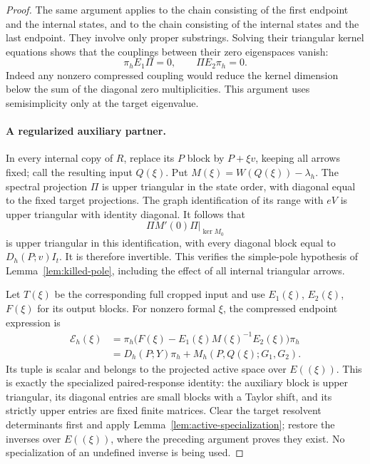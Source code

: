 \documentclass[11pt]{article}
\theoremstyle{definition}
\theoremstyle{remark}
\numberwithin{equation}{section}
\begin{document}
\begin{proof}
The same argument applies to the chain consisting of the first endpoint
and the internal states, and to the chain consisting of the internal
states and the last endpoint.  They involve only proper substrings.
Solving their triangular kernel equations shows that the couplings
between their zero eigenspaces vanish:
\begin{equation}
\label{eq:transfer-coupling-annihilation}
 \pi_hE_1\Pi=0,\qquad \Pi E_2\pi_h=0.
\end{equation}
Indeed any nonzero compressed coupling would reduce the kernel dimension
below the sum of the diagonal zero multiplicities.  This argument uses
semisimplicity only at the target eigenvalue.

\paragraph{A regularized auxiliary partner.}
In every internal copy of $R$, replace its $P$ block by $P+\xi v$, keeping
all arrows fixed; call the resulting input $Q(\xi)$.  Put
$M(\xi)=W(Q(\xi))-\lambda_h$.
The spectral projection $\Pi$ is upper triangular in the state order,
with diagonal equal to the fixed target projections.  The graph
identification of its range with $eV$ is upper triangular with identity
diagonal.  It follows that
\[
 \Pi M'(0)\Pi\big|_{\ker M_0}
\]
is upper triangular in this identification, with every diagonal block
equal to $D_h(P;v)I_t$.  It is therefore invertible.  This verifies the
simple-pole hypothesis of Lemma~\ref{lem:killed-pole}, including the
effect of all internal triangular arrows.

Let $T(\xi)$ be the corresponding full cropped input and use $E_1(\xi)$,
$E_2(\xi)$, $F(\xi)$ for its output blocks.  For nonzero formal $\xi$, the
compressed endpoint expression is
\begin{align}
 \mathcal E_h(\xi)
 &=\pi_h\bigl(F(\xi)-E_1(\xi)M(\xi)^{-1}E_2(\xi)\bigr)\pi_h
 \label{eq:transfer-regularized-expression}\\
 &=D_h(P;Y)\pi_h+M_h(P,Q(\xi);G_1,G_2).
 \nonumber
\end{align}
Its tuple is scalar and belongs to the projected active space over
$E((\xi))$.  This is exactly the specialized paired-response identity:
the auxiliary block is upper triangular, its diagonal entries are small
blocks with a Taylor shift, and its strictly upper entries are fixed
finite matrices.  Clear the target resolvent determinants first and
apply Lemma~\ref{lem:active-specialization}; restore the inverses over
$E((\xi))$, where the preceding argument proves they exist.  No
specialization of an undefined inverse is being used.


\end{proof}
\end{document}
